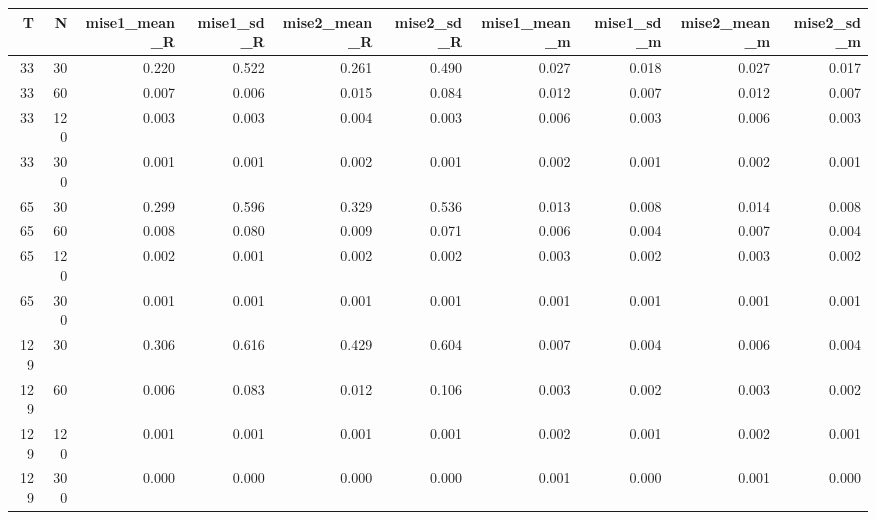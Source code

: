 \begin{table}[ht]
\centering
\begin{tabular}{rrrrrrrrrr}
  \hline
T & N & mise1\_mean\_R & mise1\_sd\_R & mise2\_mean\_R & mise2\_sd\_R & mise1\_mean\_m & mise1\_sd\_m & mise2\_mean\_m & mise2\_sd\_m \\ 
  \hline
33 & 30 & 0.220 & 0.522 & 0.261 & 0.490 & 0.027 & 0.018 & 0.027 & 0.017 \\ 
  33 & 60 & 0.007 & 0.006 & 0.015 & 0.084 & 0.012 & 0.007 & 0.012 & 0.007 \\ 
  33 & 120 & 0.003 & 0.003 & 0.004 & 0.003 & 0.006 & 0.003 & 0.006 & 0.003 \\ 
  33 & 300 & 0.001 & 0.001 & 0.002 & 0.001 & 0.002 & 0.001 & 0.002 & 0.001 \\ 
  65 & 30 & 0.299 & 0.596 & 0.329 & 0.536 & 0.013 & 0.008 & 0.014 & 0.008 \\ 
  65 & 60 & 0.008 & 0.080 & 0.009 & 0.071 & 0.006 & 0.004 & 0.007 & 0.004 \\ 
  65 & 120 & 0.002 & 0.001 & 0.002 & 0.002 & 0.003 & 0.002 & 0.003 & 0.002 \\ 
  65 & 300 & 0.001 & 0.001 & 0.001 & 0.001 & 0.001 & 0.001 & 0.001 & 0.001 \\ 
  129 & 30 & 0.306 & 0.616 & 0.429 & 0.604 & 0.007 & 0.004 & 0.006 & 0.004 \\ 
  129 & 60 & 0.006 & 0.083 & 0.012 & 0.106 & 0.003 & 0.002 & 0.003 & 0.002 \\ 
  129 & 120 & 0.001 & 0.001 & 0.001 & 0.001 & 0.002 & 0.001 & 0.002 & 0.001 \\ 
  129 & 300 & 0.000 & 0.000 & 0.000 & 0.000 & 0.001 & 0.000 & 0.001 & 0.000 \\ 
   \hline
\end{tabular}
\end{table}
